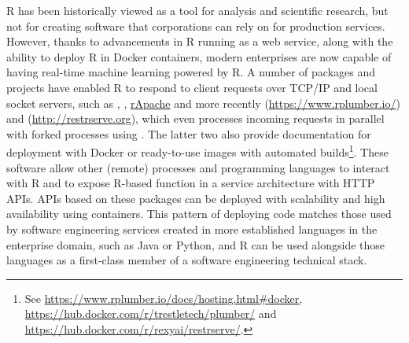 R has been historically viewed as a tool for analysis and scientific
research, but not for creating software that corporations can rely on
for production services. However, thanks to advancements in R running as
a web service, along with the ability to deploy R in Docker containers,
modern enterprises are now capable of having real-time machine learning
powered by R. A number of packages and projects have enabled R to
respond to client requests over TCP/IP and local socket servers, such as
 \citep{cran_rserve}, 
\citep{grosjean_sciviews_2019}, \href{http://www.rapache.net}{rApache}
and more recently  (\url{https://www.rplumber.io/}) and
 (\url{http://restrserve.org}), which even processes
incoming requests in parallel with forked processes using
. The latter two also provide documentation for
deployment with Docker or ready-to-use images with automated
builds\footnote{See \href{https://www.rplumber.io/docs/hosting.html\#docker}{https://www.rplumber.io/docs/hosting.html\#docker}, \href{https://hub.docker.com/r/trestletech/plumber/}{https://hub.docker.com/r/trestletech/plumber/} and \href{https://hub.docker.com/r/rexyai/restrserve/}{https://hub.docker.com/r/rexyai/restrserve/}.}.
These software allow other (remote) processes and programming languages
to interact with R and to expose R-based function in a service
architecture with HTTP APIs. APIs based on these packages can be
deployed with scalability and high availability using containers. This
pattern of deploying code matches those used by software engineering
services created in more established languages in the enterprise domain,
such as Java or Python, and R can be used alongside those languages as a
first-class member of a software engineering technical stack.

